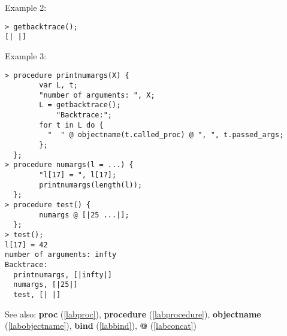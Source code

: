 \noindent Example 2: 
\begin{center}\begin{minipage}{15cm}\begin{Verbatim}[frame=single]
> getbacktrace();
[| |]
\end{Verbatim}
\end{minipage}\end{center}
\noindent Example 3: 
\begin{center}\begin{minipage}{15cm}\begin{Verbatim}[frame=single]
> procedure printnumargs(X) {
        var L, t;
        "number of arguments: ", X;
        L = getbacktrace();
            "Backtrace:";
        for t in L do {
          "  " @ objectname(t.called_proc) @ ", ", t.passed_args;
        };
  };
> procedure numargs(l = ...) {
        "l[17] = ", l[17];
        printnumargs(length(l));
  };
> procedure test() {
        numargs @ [|25 ...|];
  };
> test();
l[17] = 42
number of arguments: infty
Backtrace:
  printnumargs, [|infty|]
  numargs, [|25|]
  test, [| |]
\end{Verbatim}
\end{minipage}\end{center}
See also: \textbf{proc} (\ref{labproc}), \textbf{procedure} (\ref{labprocedure}), \textbf{objectname} (\ref{labobjectname}), \textbf{bind} (\ref{labbind}), \textbf{@} (\ref{labconcat})
